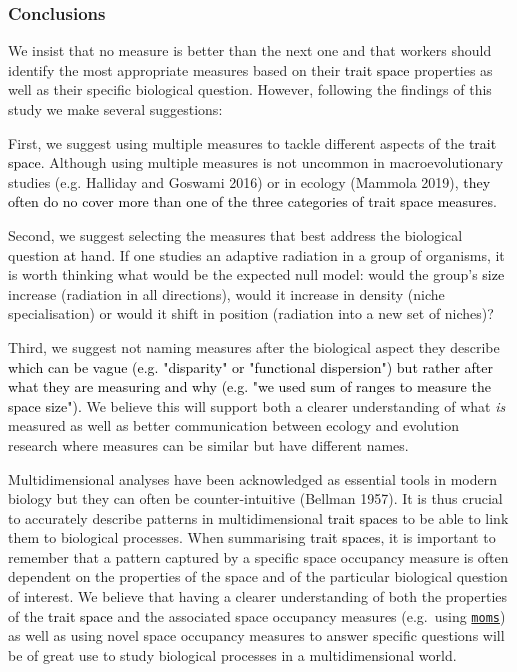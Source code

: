 \documentclass[]{article}
\begin{document}
\subsubsection{Conclusions}\label{conclusions}

We insist that no measure is better than the next one and that workers
should identify the most appropriate measures based on their
\textcolor{black}{trait space} properties as well as their
specific biological question. However, following the findings of this
study we make several suggestions:

First, we suggest using multiple measures to tackle different aspects of
the \textcolor{black}{trait space}. Although using multiple
measures is not uncommon in macroevolutionary studies (e.g. Halliday and
Goswami 2016) or in ecology (Mammola 2019),
\textcolor{black}{they often do no cover more than one of the three categories of trait space measures}.

Second, we suggest selecting the measures that best address the
biological question \textcolor{black}{at} hand. If one
studies an adaptive radiation in a group of organisms, it is worth
thinking what would be the expected null model: would the group's
\textcolor{black}{size} increase (radiation in all
directions), would it increase in density (niche specialisation) or
would it shift in position (radiation into a new set of niches)?

Third, we suggest not naming measures after the biological aspect they
describe
\textcolor{black}{which can be vague (e.g. "disparity" or "functional dispersion") but rather after what they are measuring and why (e.g. "we used sum of ranges to measure the space size").}
We believe this will support both a clearer understanding of what
\emph{is} measured as well as better communication between ecology and
evolution research where measures can be similar but have different
names.

Multidimensional analyses have been acknowledged as essential tools in
modern biology but they can often be counter-intuitive (Bellman 1957).
It is thus crucial to accurately describe patterns in multidimensional
\textcolor{black}{trait spaces} to be able to link them to
biological processes. When summarising
\textcolor{black}{trait spaces}, it is important to remember
that a pattern captured by a specific space occupancy measure is often
dependent on the properties of the space and of the particular
biological question of interest. We believe that having a clearer
understanding of both the properties of the
\textcolor{black}{trait space} and the associated space
occupancy measures (e.g.~using
\href{https://tguillerme.shinyapps.io/moms/}{\texttt{moms}}) as well as
using novel space occupancy measures to answer specific questions will
be of great use to study biological processes in a multidimensional
world.
\end{document}
